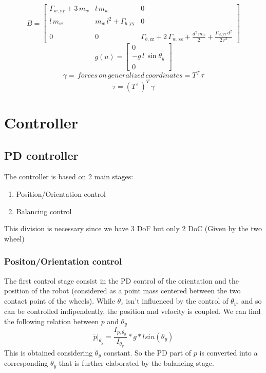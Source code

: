 \documentclass[a4paper, 7px]{article}
\begin{document}
$$B = 
\begin{bmatrix}
	\Gamma _{w,\mathrm{yy}}+3\,m_{w} & l\,m_{w} & 0\\
	l\,m_{w} & m_{w}\,l^2+\Gamma _{b,\mathrm{yy}} & 0\\
	0 & 0 & \Gamma _{b,\mathrm{zz}}+2\,\Gamma _{w,\mathrm{zz}}+\frac{d^2\,m_{w}}{2}+\frac{\Gamma _{w,\mathrm{yy}}\,d^2}{2\,r^2} \end{bmatrix}
$$
$$g(u) = 
\begin{bmatrix}
	0\\
	-g \, l \, \sin{\theta_y}\\
	0
\end{bmatrix}
$$
$$\gamma = \, forces \, on \, generalized \, coordinates = T^T \,  \tau$$
$$\tau = (T^+)^T \, \gamma$$

\section{Controller}
\subsection{PD controller}
The controller is based on 2 main stages:
\begin{enumerate}
	\item Position/Orientation control
	\item Balancing control
\end{enumerate}

This division is necessary since we have 3 DoF but only 2 DoC (Given by the two wheel)

\subsubsection{Positon/Orientation control}
The first control stage consist in the PD control of the orientation and the position of the robot (considered as a point mass centered between the two contact point of the wheels).
While $\theta_z$ isn't influenced by the control of $\theta_y$,  and so can be controlled indipendently, the position and velocity is coupled.
We can find the following relation between $\ddot p$ and $ \theta_y$ 
$$\ddot p |_{\theta_y} = \frac{I_{p, \theta_y}}{I_{\theta_y}} * g * l sin(\theta_y)$$
This is obtained considering $\ddot \theta_y$ constant.
So the PD part of $p$ is converted into a corresponding $\theta_y$ that is further elaborated by the balancing stage.
\end{document}
